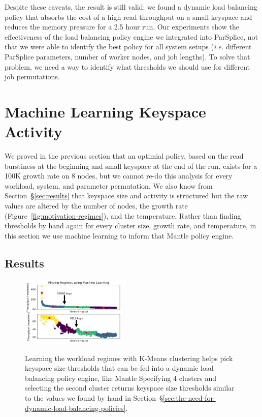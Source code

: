 Despite these caveats, the result is still valid: we found a dynamic load
balancing policy that absorbs the cost of a high read throughput on a small
keyspace and reduces the memory pressure for a 2.5 hour run. Our experiments
show the effectiveness of the load balancing policy engine we integrated into
ParSplice, not that we were able to identify the best policy for all system
setups ({\it i.e.} different ParSplice parameters, number of worker nodes, and
job lengths).  To solve that problem, we need a way to identify what thresholds
we should use for different job permutations.

\section{Machine Learning Keyspace Activity}

We proved in the previous section that an optimial policy, based on the read
burstiness at the beginning and small keyspace at the end of the run,  exists
for a 100K growth rate on 8 nodes, but we cannot re-do this analysis for every
workload, system, and parameter permutation.  We also know from
Section~\S\ref{sec:results} that keyspace size and activity is structured but
the raw values are altered by the number of nodes, the growth rate
(Figure~\ref{fig:motivation-regimes}), and the temperature. Rather than finding
thresholds by hand again for every cluster size, growth rate, and temperature,
in this section we use machine learning to inform that Mantle policy engine. 


\subsection*{Results}

\begin{figure}[tbh]
\noindent\includegraphics[width=0.45\textwidth]{figures/futurework-regimes.png}\\
  \caption{Learning the workload regimes with K-Means clustering helps pick
  keyspace size thresholds that can be fed into a dynamic load balancing policy
  engine, like Mantle Specifying 4 clusters and selecting the second cluster
  returns keyspace size thresholds similar to the values we found by hand in
  Section~\S\ref{sec:the-need-for-dynamic-load-balancing-policies}.
\label{fig:futurework-regimes}}
\end{figure}

